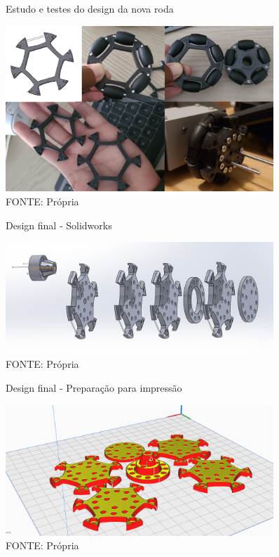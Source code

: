 \begin{figure}[h]
	\centering
	\caption{Estudo e testes do design da nova roda}
	\includegraphics[width=0.9\textwidth]{figures/estudo_roda}
    \caption*{FONTE: Própria}
\end{figure}

\begin{figure}[h]
	\centering
	\caption{Design final - Solidworks}
	\includegraphics[width=0.9\textwidth]{figures/roda_processo_desing_passo2}
    \caption*{FONTE: Própria}
\end{figure}

\begin{figure}[h]
	\centering
	\caption{Design final - Preparação para impressão}
	\includegraphics[width=0.9\textwidth]{figures/roda_processo_desing_passo3}
    \caption*{FONTE: Própria}
\end{figure}

